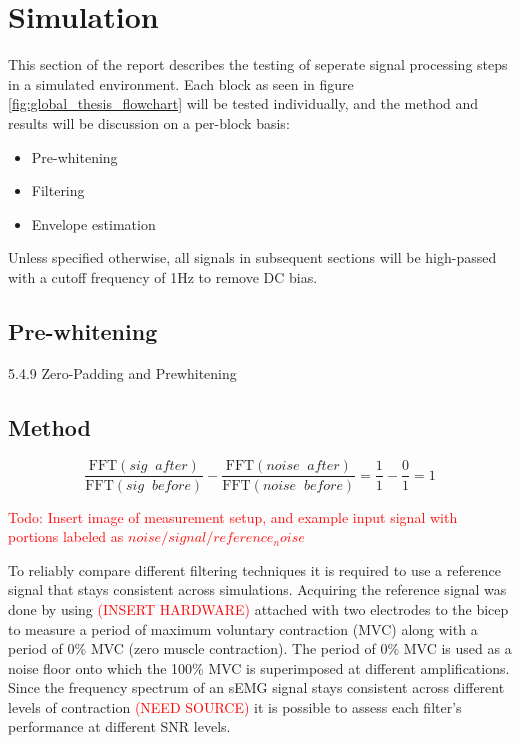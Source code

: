 \chapter{Simulation}
This section of the report describes the testing of seperate signal processing steps in a simulated environment. Each block as seen in figure \ref{fig:global_thesis_flowchart} will be tested individually, and the method and results will be discussion on a per-block basis:
\begin{itemize}
    \item Pre-whitening
    \item Filtering
    \item Envelope estimation
\end{itemize}

Unless specified otherwise, all signals in subsequent sections will be high-passed with a cutoff frequency of 1Hz to remove DC bias.

\section{Pre-whitening}
\cite{time_series_analysis_methods}


5.4.9 Zero-Padding and Prewhitening










\section{Method}

\begin{equation}
    \frac{\text{FFT}(sig \;\; after)}{\text{FFT}(sig \;\;  before)} - \frac{\text{FFT}(noise \;\;  after)}{\text{FFT}(noise \;\;  before)} = \frac{1}{1} - \frac{0}{1} = 1
\end{equation}

\textcolor{red}{Todo: Insert image of measurement setup, and example input signal with portions labeled as $noise/signal/reference_noise$}


To reliably compare different filtering techniques it is required to use a reference signal that stays consistent across simulations. Acquiring the reference signal was done by using \textcolor{red}{(INSERT HARDWARE)} attached with two electrodes to the bicep to measure a period of maximum voluntary contraction (MVC) along with a period of 0\% MVC (zero muscle contraction). The period of 0\% MVC is used as a noise floor onto which the 100\% MVC is superimposed at different amplifications. Since the frequency spectrum of an sEMG signal stays consistent across different levels of contraction \textcolor{red}{(NEED SOURCE)} it is possible to assess each filter's performance at different SNR levels.

